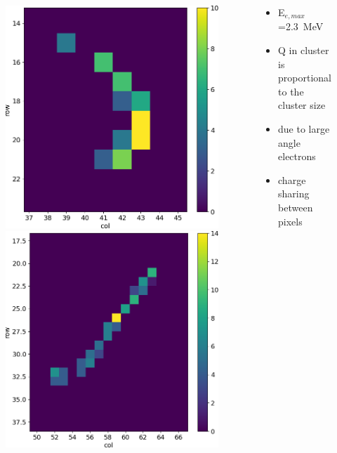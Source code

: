 \begin{frame}
\begin{columns}
\begin{figure}
                    \includegraphics[width=.3\linewidth]{figures/charaterization/evts/Sr90/10b.png} 
                    \includegraphics[width=.3\linewidth]{figures/charaterization/evts/Sr90/21a.png}
                \end{figure}
                \begin{itemize}
                    \item E$_{e, max}$=\SI{2.3}{MeV}
                    \item Q in cluster is proportional to the cluster size
                    \item due to large angle electrons
                    \item charge sharing between pixels 
                \end{itemize}
        \end{columns}
    \end{frame}    

